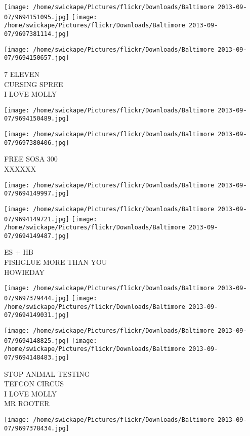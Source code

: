 \documentclass[10pt,letterpaper]{article}
\begin{document}
\texttt{[image: /home/swickape/Pictures/flickr/Downloads/Baltimore 2013-09-07/9694151095.jpg]}
\texttt{[image: /home/swickape/Pictures/flickr/Downloads/Baltimore 2013-09-07/9697381114.jpg]}

\vspace{0.25in}
\texttt{[image: /home/swickape/Pictures/flickr/Downloads/Baltimore 2013-09-07/9694150657.jpg]}

7 ELEVEN\\
CURSING SPREE\\
I LOVE MOLLY
\pagebreak

\texttt{[image: /home/swickape/Pictures/flickr/Downloads/Baltimore 2013-09-07/9694150489.jpg]}

\vspace{0.25in}
\texttt{[image: /home/swickape/Pictures/flickr/Downloads/Baltimore 2013-09-07/9697380406.jpg]}

FREE SOSA 300\\
XXXXXX
\pagebreak

\texttt{[image: /home/swickape/Pictures/flickr/Downloads/Baltimore 2013-09-07/9694149997.jpg]}

\vspace{0.25in}
\texttt{[image: /home/swickape/Pictures/flickr/Downloads/Baltimore 2013-09-07/9694149721.jpg]}
\texttt{[image: /home/swickape/Pictures/flickr/Downloads/Baltimore 2013-09-07/9694149487.jpg]}

ES  + HB\\
FISHGLUE MORE THAN YOU\\
HOWIEDAY
\pagebreak

\texttt{[image: /home/swickape/Pictures/flickr/Downloads/Baltimore 2013-09-07/9697379444.jpg]}
\texttt{[image: /home/swickape/Pictures/flickr/Downloads/Baltimore 2013-09-07/9694149031.jpg]}

\texttt{[image: /home/swickape/Pictures/flickr/Downloads/Baltimore 2013-09-07/9694148825.jpg]}
\texttt{[image: /home/swickape/Pictures/flickr/Downloads/Baltimore 2013-09-07/9694148483.jpg]}

STOP ANIMAL TESTING\\
TEFCON CIRCUS\\
I LOVE MOLLY\\
MR ROOTER
\pagebreak

\texttt{[image: /home/swickape/Pictures/flickr/Downloads/Baltimore 2013-09-07/9697378434.jpg]}
\end{document}
